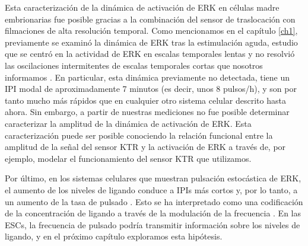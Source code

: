 \documentclass[./main.tex]{subfiles}
\begin{document}
Esta caracterización de la dinámica de activación de ERK en células madre embrionarias fue posible gracias a la combinación del sensor de traslocación con filmaciones de alta resolución temporal. Como mencionamos en el capítulo \ref{ch1}, previamente se examinó la dinámica de ERK tras la estimulación aguda, estudio que se centró en la actividad de ERK en escalas temporales lentas y no resolvió las oscilaciones intermitentes de escalas temporales cortas que nosotros informamos \cite{Deathridge2019}. En particular, esta dinámica previamente no detectada, tiene un IPI modal de aproximadamente 7 minutos (es decir, unos 8 pulsos/h), y son por tanto mucho más rápidos que en cualquier otro sistema celular descrito hasta ahora. Sin embargo, a partir de nuestras mediciones no fue posible determinar caracterizar la amplitud de la dinámica de activación de ERK. Esta caracterización puede ser posible conociendo la relación funcional entre la amplitud de la señal del sensor KTR y la activación de ERK a través de, por ejemplo, modelar el funcionamiento del sensor KTR que utilizamos.


Por último, en los sistemas celulares que muestran pulsación estocástica de ERK, el aumento de los niveles de ligando conduce a IPIs más cortos y, por lo tanto, a un aumento de la tasa de pulsado \cite{Albeck2013}. Esto se ha interpretado como una codificación de la concentración de ligando a través de la modulación de la frecuencia \cite{Li2019}. En las ESCs, la frecuencia de pulsado podría transmitir información sobre los niveles de ligando, y en el próximo capítulo exploramos esta hipótesis.  
 
\end{document}
